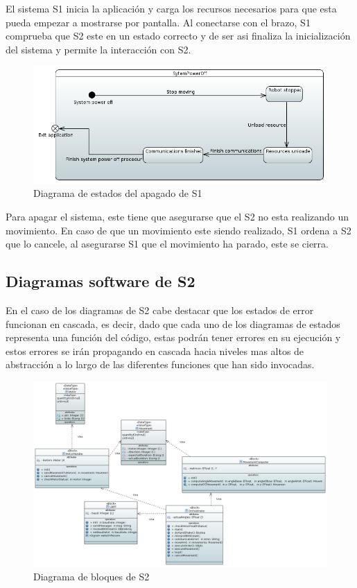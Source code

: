 El sistema \ac{S1} inicia la aplicación y carga los recursos necesarios para que esta pueda empezar a mostrarse por pantalla. Al conectarse con el brazo, \ac{S1} comprueba que \ac{S2} este en un estado correcto y de ser asi finaliza la inicialización del sistema y permite la interacción con \ac{S2}.

\begin{figure}[H]
    \centering
    \includegraphics[width=\linewidth]{pictures/S1SystemPowerOff.PNG}
    \caption{Diagrama de estados del apagado de \ac{S1}}
    \label{fig:diagrama_estados_apagado_s1}
\end{figure}

Para apagar el sistema, este tiene que asegurarse que el \ac{S2} no esta realizando un movimiento. En caso de que un movimiento este siendo realizado, \ac{S1} ordena a \ac{S2} que lo cancele, al asegurarse \ac{S1} que el movimiento ha parado, este se cierra.

\subsection{Diagramas software de S2}

En el caso de los diagramas de \ac{S2} cabe destacar que los estados de error funcionan en cascada, es decir, dado que cada uno de los diagramas de estados representa una función del código, estas podrán tener errores en su ejecución y estos errores se irán propagando en cascada hacia niveles mas altos de abstracción a lo largo de las diferentes funciones que han sido invocadas.

\begin{figure}[H]
    \centering
    \includegraphics[width=\linewidth]{pictures/S2BlockDiagram.PNG}
    \caption{Diagrama de bloques de \ac{S2}}
    \label{fig:diagrama_bloques_s2}
\end{figure}

